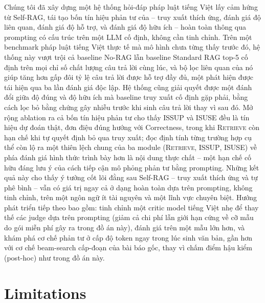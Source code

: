 \documentclass[11pt]{article}
\begin{document}
Chúng tôi đã xây dựng một hệ thống hỏi-đáp pháp luật tiếng Việt lấy cảm hứng từ Self-RAG, tái tạo bốn tín hiệu phản tư của \citet{asai2024selfrag} -- truy xuất thích ứng, đánh giá độ liên quan, đánh giá độ hỗ trợ, và đánh giá độ hữu ích -- hoàn toàn thông qua prompting có cấu trúc trên một LLM cố định, không cần tinh chỉnh. Trên một benchmark pháp luật tiếng Việt thực tế mà mô hình chưa từng thấy trước đó, hệ thống này vượt trội cả baseline No-RAG lẫn baseline Standard RAG top-5 cố định trên mọi chỉ số chất lượng câu trả lời cùng lúc, và bộ lọc liên quan của nó giúp tăng hơn gấp đôi tỷ lệ câu trả lời được hỗ trợ đầy đủ, một phát hiện được tái hiện qua ba lần đánh giá độc lập. Hệ thống cũng giải quyết được một đánh đổi giữa độ đúng và độ hữu ích mà baseline truy xuất cố định gặp phải, bằng cách lọc bỏ bằng chứng gây nhiễu trước khi sinh câu trả lời thay vì sau đó. Mở rộng ablation ra cả bốn tín hiệu phản tư cho thấy \textsc{ISSUP} và \textsc{ISUSE} đều là tín hiệu dự đoán thật, đơn điệu đúng hướng với Correctness, trong khi \textsc{Retrieve} còn hạn chế khi tự quyết định bỏ qua truy xuất; đọc định tính từng trường hợp cụ thể còn lộ ra một thiên lệch chung của ba module (\textsc{Retrieve}, \textsc{ISSUP}, \textsc{ISUSE}) về phía đánh giá hình thức trình bày hơn là nội dung thực chất -- một hạn chế cố hữu đáng lưu ý của cách tiếp cận mô phỏng phản tư bằng prompting. Những kết quả này cho thấy ý tưởng cốt lõi đằng sau Self-RAG -- truy xuất thích ứng và tự phê bình -- vẫn có giá trị ngay cả ở dạng hoàn toàn dựa trên prompting, không tinh chỉnh, trên một ngôn ngữ ít tài nguyên và một lĩnh vực chuyên biệt. Hướng phát triển tiếp theo bao gồm: tinh chỉnh một critic model tiếng Việt nhẹ để thay thế các judge dựa trên prompting (giảm cả chi phí lẫn giới hạn cứng về cỡ mẫu do gói miễn phí gây ra trong đồ án này), đánh giá trên một mẫu lớn hơn, và khám phá cơ chế phản tư ở cấp độ token ngay trong lúc sinh văn bản, gần hơn với cơ chế beam-search cấp-đoạn của bài báo gốc, thay vì chấm điểm hậu kiểm (post-hoc) như trong đồ án này.

\section*{Limitations}
\label{sec:limitations}
\end{document}
